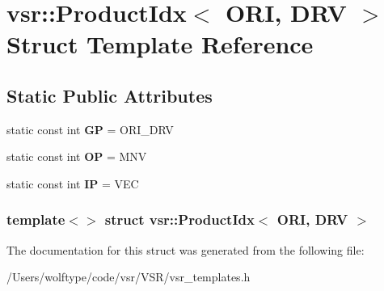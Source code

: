\hypertarget{structvsr_1_1_product_idx_3_01_o_r_i_00_01_d_r_v_01_4}{\section{vsr\-:\-:Product\-Idx$<$ O\-R\-I, D\-R\-V $>$ Struct Template Reference}
\label{structvsr_1_1_product_idx_3_01_o_r_i_00_01_d_r_v_01_4}
}
\subsection*{Static Public Attributes}
\begin{DoxyCompactItemize}
\item 
\hypertarget{structvsr_1_1_product_idx_3_01_o_r_i_00_01_d_r_v_01_4_ab9a7d5acaa623b947e970b0f31ebe728}{static const int {\bfseries G\-P} = O\-R\-I\-\_\-\-D\-R\-V}\label{structvsr_1_1_product_idx_3_01_o_r_i_00_01_d_r_v_01_4_ab9a7d5acaa623b947e970b0f31ebe728}

\item 
\hypertarget{structvsr_1_1_product_idx_3_01_o_r_i_00_01_d_r_v_01_4_aadcdcaba9f2886007ab0a6600526fd3b}{static const int {\bfseries O\-P} = M\-N\-V}\label{structvsr_1_1_product_idx_3_01_o_r_i_00_01_d_r_v_01_4_aadcdcaba9f2886007ab0a6600526fd3b}

\item 
\hypertarget{structvsr_1_1_product_idx_3_01_o_r_i_00_01_d_r_v_01_4_aebe2970627716f6ddca44e509f9b0e3b}{static const int {\bfseries I\-P} = V\-E\-C}\label{structvsr_1_1_product_idx_3_01_o_r_i_00_01_d_r_v_01_4_aebe2970627716f6ddca44e509f9b0e3b}

\end{DoxyCompactItemize}
\subsubsection*{template$<$$>$ struct vsr\-::\-Product\-Idx$<$ O\-R\-I, D\-R\-V $>$}



The documentation for this struct was generated from the following file\-:\begin{DoxyCompactItemize}
\item 
/\-Users/wolftype/code/vsr/\-V\-S\-R/vsr\-\_\-templates.\-h\end{DoxyCompactItemize}
